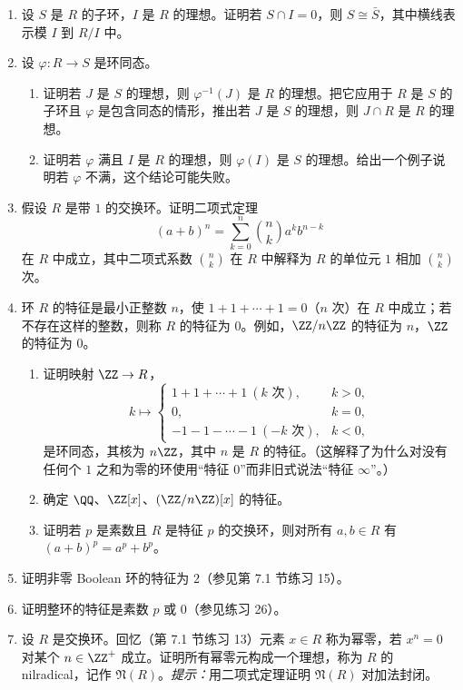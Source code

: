\begin{enumerate}[label=\arabic*.]
\begin{enumerate}[label=(\alph*)]
	\end{enumerate}
	\item 设 $S$ 是 $R$ 的子环，$I$ 是 $R$ 的理想。证明若 $S\cap I=0$，则 $S\cong\bar S$，其中横线表示模 $I$ 到 $R/I$ 中。
	\item 设 $\varphi:R\to S$ 是环同态。
	\begin{enumerate}[label=(\alph*)]
		\item 证明若 $J$ 是 $S$ 的理想，则 $\varphi^{-1}(J)$ 是 $R$ 的理想。把它应用于 $R$ 是 $S$ 的子环且 $\varphi$ 是包含同态的情形，推出若 $J$ 是 $S$ 的理想，则 $J\cap R$ 是 $R$ 的理想。
		\item 证明若 $\varphi$ 满且 $I$ 是 $R$ 的理想，则 $\varphi(I)$ 是 $S$ 的理想。给出一个例子说明若 $\varphi$ 不满，这个结论可能失败。
	\end{enumerate}
	\item 假设 $R$ 是带 $1$ 的交换环。证明二项式定理
	\[
	(a+b)^n=\sum_{k=0}^n {n\choose k}a^kb^{n-k}
	\]
	在 $R$ 中成立，其中二项式系数 ${n\choose k}$ 在 $R$ 中解释为 $R$ 的单位元 $1$ 相加 ${n\choose k}$ 次。
	\item 环 $R$ 的特征是最小正整数 $n$，使 $1+1+\cdots+1=0$（$n$ 次）在 $R$ 中成立；若不存在这样的整数，则称 $R$ 的特征为 $0$。例如，$\ZZ/n\ZZ$ 的特征为 $n$，$\ZZ$ 的特征为 $0$。
	\begin{enumerate}[label=(\alph*)]
		\item 证明映射 $\ZZ\to R$，
		\[
		k\mapsto
		\begin{cases}
			1+1+\cdots+1\ (k\text{ 次}),&k>0,\\
			0,&k=0,\\
			-1-1-\cdots-1\ (-k\text{ 次}),&k<0,
		\end{cases}
		\]
		是环同态，其核为 $n\ZZ$，其中 $n$ 是 $R$ 的特征。（这解释了为什么对没有任何个 $1$ 之和为零的环使用“特征 $0$”而非旧式说法“特征 $\infty$”。）
		\item 确定 $\QQ$、$\ZZ[x]$、$(\ZZ/n\ZZ)[x]$ 的特征。
		\item 证明若 $p$ 是素数且 $R$ 是特征 $p$ 的交换环，则对所有 $a,b\in R$ 有 $(a+b)^p=a^p+b^p$。
	\end{enumerate}
	\item 证明非零 Boolean 环的特征为 $2$（参见第 7.1 节练习 15）。
	\item 证明整环的特征是素数 $p$ 或 $0$（参见练习 26）。
	\item 设 $R$ 是交换环。回忆（第 7.1 节练习 13）元素 $x\in R$ 称为幂零，若 $x^n=0$ 对某个 $n\in\ZZ^+$ 成立。证明所有幂零元构成一个理想，称为 $R$ 的 nilradical，记作 $\mathfrak N(R)$。\emph{提示：}用二项式定理证明 $\mathfrak N(R)$ 对加法封闭。

\end{enumerate}

